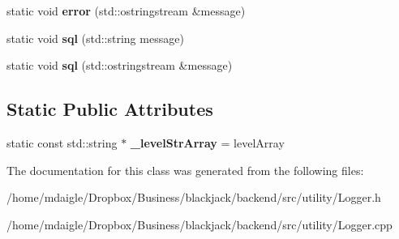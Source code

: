 \begin{DoxyCompactItemize}
\item 
\hypertarget{classLogger_a15c98cdd8700913c929ec6496dddc292}{
static void {\bfseries error} (std\-::ostringstream \&message)}
\label{classLogger_a15c98cdd8700913c929ec6496dddc292}

\item 
\hypertarget{classLogger_a515be59fccbf995ddb55a4647e5410b1}{
static void {\bfseries sql} (std\-::string message)}
\label{classLogger_a515be59fccbf995ddb55a4647e5410b1}

\item 
\hypertarget{classLogger_a6da936db51e93c11611026d01cc2e470}{
static void {\bfseries sql} (std\-::ostringstream \&message)}
\label{classLogger_a6da936db51e93c11611026d01cc2e470}

\end{DoxyCompactItemize}
\subsection*{\-Static \-Public \-Attributes}
\begin{DoxyCompactItemize}
\item 
\hypertarget{classLogger_acaaf11fc84d3d7e5ef7f4eb45407084a}{
static const std\-::string $\ast$ {\bfseries \-\_\-level\-Str\-Array} = level\-Array}
\label{classLogger_acaaf11fc84d3d7e5ef7f4eb45407084a}

\end{DoxyCompactItemize}


\-The documentation for this class was generated from the following files\-:\begin{DoxyCompactItemize}
\item 
/home/mdaigle/\-Dropbox/\-Business/blackjack/backend/src/utility/\-Logger.\-h\item 
/home/mdaigle/\-Dropbox/\-Business/blackjack/backend/src/utility/\-Logger.\-cpp\end{DoxyCompactItemize}
